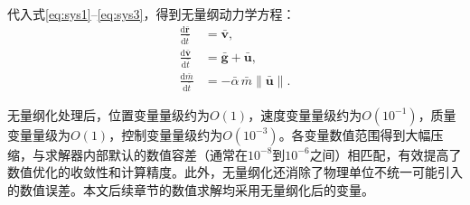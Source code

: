 代入式\eqref{eq:sys1}--\eqref{eq:sys3}，得到无量纲动力学方程：
\begin{align}
    \frac{\mathrm{d}\bar{\bm{r}}}{\mathrm{d}\bar{t}} &= \bar{\bm{v}}, \\
    \frac{\mathrm{d}\bar{\bm{v}}}{\mathrm{d}\bar{t}} &= \bar{\bm{g}} + \bar{\bm{u}}, \\
    \frac{\mathrm{d}\bar{m}}{\mathrm{d}\bar{t}} &= -\bar{\alpha}\,\bar{m}\|\bar{\bm{u}}\|.
\end{align}

无量纲化处理后，位置变量量级约为$O(1)$，速度变量量级约为$O(10^{-1})$，质量变量量级为$O(1)$，控制变量量级约为$O(10^{-3})$。各变量数值范围得到大幅压缩，与求解器内部默认的数值容差（通常在$10^{-8}$到$10^{-6}$之间）相匹配，有效提高了数值优化的收敛性和计算精度。此外，无量纲化还消除了物理单位不统一可能引入的数值误差。本文后续章节的数值求解均采用无量纲化后的变量。
